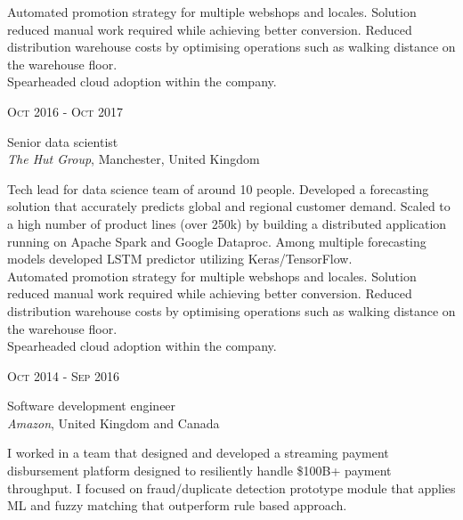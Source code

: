 \documentclass[10pt]{article} %
\begin{document}
{\begin{minipage}[t]{0.5\textwidth}
{Automated promotion strategy for multiple webshops and locales. 
Solution reduced manual work required while achieving better conversion.
Reduced distribution warehouse costs by optimising operations such 
as walking distance on the warehouse floor.
\\

Spearheaded cloud adoption within the company.}\\



\vspace{0.5cm}
{\raggedleft\textsc{Oct 2016 - Oct 2017}\par}

{\raggedright\large Senior data scientist\\
\textit{The Hut Group}, Manchester, United Kingdom\\[5pt]}

\normalsize{Tech lead for data science team of around 10 people. 
Developed a forecasting solution that accurately predicts global 
and regional customer demand. Scaled to a high number of product 
lines (over 250k) by building a distributed application running 
on Apache Spark and Google Dataproc. Among multiple forecasting models 
developed LSTM predictor utilizing Keras/TensorFlow.
\\

Automated promotion strategy for multiple webshops and locales. 
Solution reduced manual work required while achieving better conversion.
Reduced distribution warehouse costs by optimising operations such 
as walking distance on the warehouse floor.
\\

Spearheaded cloud adoption within the company.}\\


\vspace{0.5cm}
{\raggedleft\textsc{Oct 2014 - Sep 2016}\par}

{\raggedright\large Software development engineer\\
\textit{Amazon}, United Kingdom and Canada\\[5pt]}

\normalsize{I worked in a team that designed and 
developed a streaming payment disbursement 
platform designed to resiliently handle \$100B+ payment throughput. 
I focused on fraud/duplicate detection prototype module
that applies ML and fuzzy matching that outperform rule based approach.
\\

}
\end{minipage}}
\end{document}
